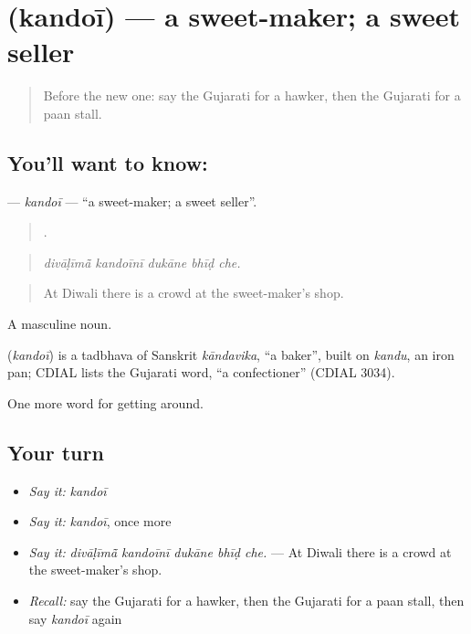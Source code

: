 \section[\texorpdfstring{\gu{કંદોઈ} (kandoī)}{કંદોઈ (kandoī)}]{ (kandoī) — a sweet-maker; a sweet seller}

\label{lesson:GU-C422-kandoi}



\begin{quote}
Before the new one: say the Gujarati for a hawker, then the Gujarati for a paan stall.
\end{quote}

\subsection*{You'll want to know: }
\textbf{} — \emph{kandoī} — \textquotedblleft{}a sweet-maker; a sweet seller\textquotedblright{}.

\begin{quote}
    .
\end{quote}

\begin{quote}
\emph{divāḷīmā̃ kandoīnī dukāne bhīḍ che.}
\end{quote}

\begin{quote}
At Diwali there is a crowd at the sweet-maker's shop.
\end{quote}

A masculine noun.

\begin{cousinweb}
\textbf{} (\emph{kandoī}) is a tadbhava of Sanskrit \emph{kāndavika}, \textquotedblleft{}a baker\textquotedblright{}, built on \emph{kandu}, an iron pan; CDIAL lists the Gujarati word, \textquotedblleft{}a confectioner\textquotedblright{} (CDIAL 3034).
\end{cousinweb}

\begin{grammarlens}[title={What you've built}]
One more word for getting around.
\end{grammarlens}

\subsection*{Your turn}
\begin{itemize}
\raggedright
  \item \emph{Say it:} \emph{kandoī}
  \item \emph{Say it:} \emph{kandoī}, once more
  \item \emph{Say it:} \emph{divāḷīmā̃ kandoīnī dukāne bhīḍ che.} — At Diwali there is a crowd at the sweet-maker's shop.
  \item \emph{Recall:} say the Gujarati for a hawker, then the Gujarati for a paan stall, then say \emph{kandoī} again
\end{itemize}

